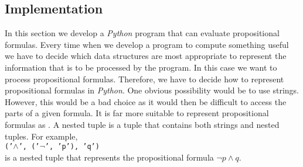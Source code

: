 \subsection{Implementation} 
In this section we develop a \textsl{Python} program that can evaluate propositional formulas.
Every time when we develop a program to compute something useful we have to decide which data structures are
most appropriate to represent the information that is to be processed by the program.  In this case we want to
process propositional formulas.  Therefore, we have to decide how to represent propositional formulas in
\textsl{Python}.  One obvious possibility would be to use strings.  However, this would be a bad choice as it
would then be difficult to access the parts of a given formula.  It is far more suitable to represent
propositional formulas as .  A nested tuple is a tuple that contains both strings and
nested tuples.  For example,
\\[0.2cm]
\hspace*{1.3cm}
\texttt{('$\wedge$', ('$\neg$', 'p'), 'q')}
\\[0.2cm]
is a nested tuple that represents the propositional formula $\neg p \wedge q$.

